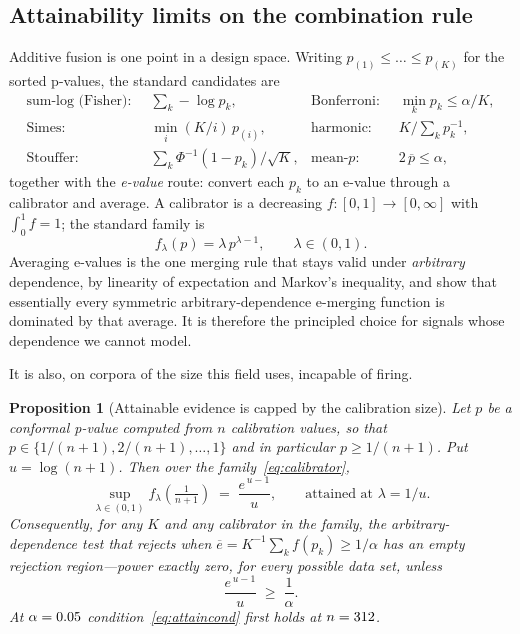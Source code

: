 \documentclass[pdflatex,sn-basic]{sn-jnl}%
\theoremstyle{thmstyleone}
\newtheorem{proposition}[theorem]{Proposition}
\theoremstyle{thmstyletwo}
\theoremstyle{thmstylethree}
\begin{document}
\subsection{Attainability limits on the combination rule}
\label{sec:attainability}

Additive fusion is one point in a design space. Writing $p_{(1)} \le \dots \le
p_{(K)}$ for the sorted p-values, the standard candidates are
\begin{align*}
\text{sum-log (Fisher)}:&\;\; \textstyle\sum_k -\log p_k,
&\text{Bonferroni}:&\;\; \min_k p_k \le \alpha/K, \\
\text{Simes}:&\;\; \min_i (K/i)\, p_{(i)},
&\text{harmonic}:&\;\; K / \textstyle\sum_k p_k^{-1}, \\
\text{Stouffer}:&\;\; \textstyle\sum_k \Phi^{-1}(1 - p_k)/\sqrt{K},
&\text{mean-}p:&\;\; 2\,\overline{p} \le \alpha,
\end{align*}
together with the \emph{e-value} route: convert each $p_k$ to an e-value through a
calibrator and average. A calibrator is a decreasing $f:[0,1] \to [0,\infty]$ with
$\int_0^1 f = 1$; the standard family is
\begin{equation}\label{eq:calibrator}
f_\lambda(p) = \lambda\, p^{\lambda - 1}, \qquad \lambda \in (0,1).
\end{equation}
Averaging e-values is the one merging rule that stays valid under
\emph{arbitrary} dependence, by linearity of expectation and Markov's
inequality, and \citet{vovk2021evalues} show that essentially every symmetric
arbitrary-dependence e-merging function is dominated by that average. It is
therefore the principled choice for signals whose dependence we cannot model.

It is also, on corpora of the size this field uses, incapable of firing.

\begin{proposition}[Attainable evidence is capped by the calibration size]
\label{prop:attain}
Let $p$ be a conformal p-value computed from $n$ calibration values, so that
$p \in \{1/(n{+}1), 2/(n{+}1), \dots, 1\}$ and in particular $p \ge 1/(n{+}1)$.
Put $u = \log(n{+}1)$. Then over the family~\eqref{eq:calibrator},
\begin{equation}\label{eq:maxe}
\sup_{\lambda \in (0,1)} f_\lambda\!\left(\tfrac{1}{n+1}\right)
\;=\; \frac{e^{\,u-1}}{u},
\qquad\text{attained at } \lambda = 1/u .
\end{equation}
Consequently, for any $K$ and any calibrator in the family, the
arbitrary-dependence test that rejects when
$\overline{e} = K^{-1}\sum_k f(p_k) \ge 1/\alpha$ has an empty rejection
region---power exactly zero, for every possible data set, unless
\begin{equation}\label{eq:attaincond}
\frac{e^{\,u-1}}{u} \;\ge\; \frac{1}{\alpha}.
\end{equation}
At $\alpha = 0.05$ condition~\eqref{eq:attaincond} first holds at
$n = 312$.
\end{proposition}
\end{document}
